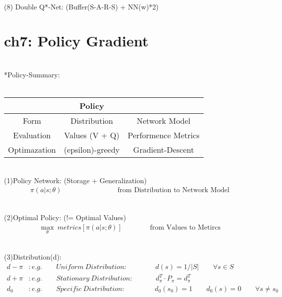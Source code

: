 \documentclass{article}
\begin{document}
~ \\[48pt]
(8) Double Q*-Net: \qquad (Buffer(S-A-R-S) + NN(w)*2) 


\newpage
\section*{ch7: Policy Gradient}


~ \\[3pt]
*Policy-Summary: \\[3pt]
~ \\[3pt]
\centering
\begin{tabular}{ccc}  %

    \toprule 
        & \qquad \qquad \qquad \qquad \qquad \qquad \qquad Policy & \\[3pt]
    \midrule 
        Form          & Distribution        & Network Model         \\[3pt]
        Evaluation    & Values (V + Q)      & Performence Metrics   \\[3pt]
        Optimazation  & (epsilon)-greedy    & Gradient-Descent      \\[3pt]
    \bottomrule 

\end{tabular}
\flushleft


~ \\[3pt]
(1)Policy Network: (Storage + Generalization) 
\begin{align*}
    \pi (a | s; \theta ) 
    \qquad \qquad \qquad \qquad \text{from Distribution to Network Model} 
\end{align*}

~ \\[3pt]
(2)Optimal Policy: (!= Optimal Values) 
\begin{align*}
    \max_{\theta} \ metrics[ \pi (a | s; \theta ) ] 
    \qquad \qquad \text{from Values to Metircs} 
\end{align*}

~ \\[3pt]
(3)Distribution(d): 
\begin{align*}
    d - \pi &: e.g. 
            \qquad Uniform \ Distribution : \qquad \qquad 
            d(s) = 1 / | S | \qquad \forall s \in S \\[3pt]
    d + \pi &: e.g. 
            \qquad Stationary \ Distribution : \qquad \quad \ 
            d_{\pi}^{T} \cdot P_{\pi} = d_{\pi}^{T} \\[3pt]
    d_{0}   &: e.g. 
            \qquad Specific \ Distribution : \qquad \qquad \ 
            d_{0}(s_{0}) = 1 
            \qquad  d_{0}(s) = 0 \qquad \forall s \neq s_{0} 
\end{align*}
\end{document}
